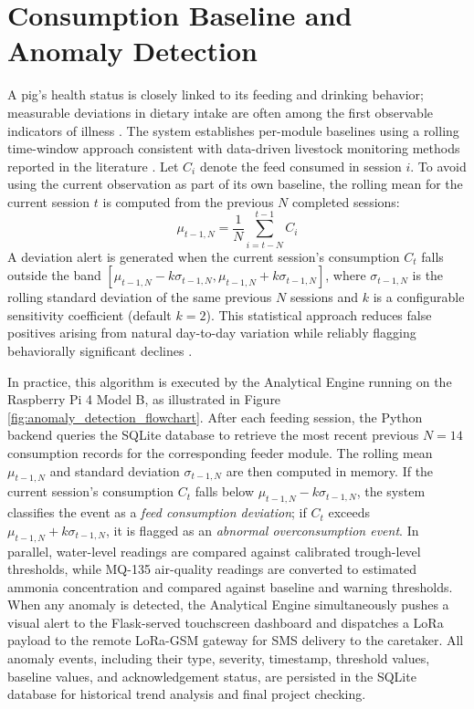 \section{Consumption Baseline and Anomaly Detection}
A pig's health status is closely linked to its feeding and drinking behavior; measurable deviations in dietary intake are often among the first observable indicators of illness \cite{dingcong2017monitoring,sadeghi2023improving}. The system establishes per-module baselines using a rolling time-window approach consistent with data-driven livestock monitoring methods reported in the literature \cite{racewicz2021welfare,sadeghi2023improving}. Let $C_i$ denote the feed consumed in session $i$. To avoid using the current observation as part of its own baseline, the rolling mean for the current session $t$ is computed from the previous $N$ completed sessions:
\begin{equation}
  \mu_{t-1,N} = \frac{1}{N} \sum_{i=t-N}^{t-1} C_i
\end{equation}
A deviation alert is generated when the current session's consumption $C_t$ falls outside the band $[\mu_{t-1,N} - k\sigma_{t-1,N}, \mu_{t-1,N} + k\sigma_{t-1,N}]$, where $\sigma_{t-1,N}$ is the rolling standard deviation of the same previous $N$ sessions and $k$ is a configurable sensitivity coefficient (default $k=2$). This statistical approach reduces false positives arising from natural day-to-day variation while reliably flagging behaviorally significant declines \cite{sadeghi2023improving,racewicz2021welfare}.

In practice, this algorithm is executed by the Analytical Engine running on the Raspberry Pi 4 Model B, as illustrated in Figure \ref{fig:anomaly_detection_flowchart}. After each feeding session, the Python backend queries the SQLite database to retrieve the most recent previous $N = 14$ consumption records for the corresponding feeder module. The rolling mean $\mu_{t-1,N}$ and standard deviation $\sigma_{t-1,N}$ are then computed in memory. If the current session's consumption $C_t$ falls below $\mu_{t-1,N} - k\sigma_{t-1,N}$, the system classifies the event as a \textit{feed consumption deviation}; if $C_t$ exceeds $\mu_{t-1,N} + k\sigma_{t-1,N}$, it is flagged as an \textit{abnormal overconsumption event}. In parallel, water-level readings are compared against calibrated trough-level thresholds, while MQ-135 air-quality readings are converted to estimated ammonia concentration and compared against baseline and warning thresholds. When any anomaly is detected, the Analytical Engine simultaneously pushes a visual alert to the Flask-served touchscreen dashboard and dispatches a LoRa payload to the remote LoRa-GSM gateway for SMS delivery to the caretaker. All anomaly events, including their type, severity, timestamp, threshold values, baseline values, and acknowledgement status, are persisted in the SQLite database for historical trend analysis and final project checking.

